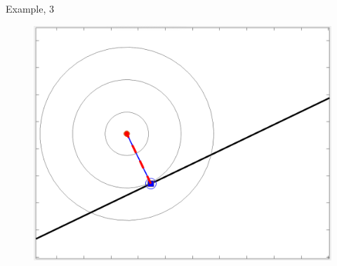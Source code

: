 \documentclass{beamer}
\begin{document}
\begin{frame}{Example, 3}
	\begin{flushleft}
		
		\begin{figure}
			\centering
			\includegraphics[width=0.7\linewidth]{fig1}
		\end{figure}
		
		
		
	\end{flushleft}
\end{frame}







\myqrframe
\end{document}
